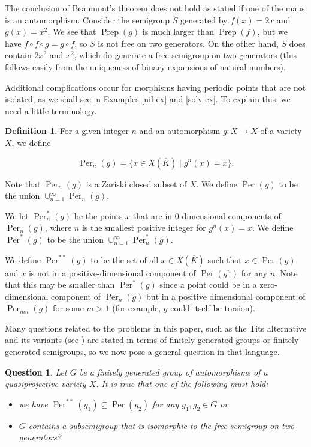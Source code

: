\documentclass{amsart}
\newcommand{\lra}{\longrightarrow}
\DeclareMathOperator{\Prep}{Prep}
\DeclareMathOperator{\Per}{Per}
\newcommand{\Kbar}{ \overline{K}}
\newtheorem{quest}[thm]{Question}
\theoremstyle{definition}
\newtheorem{defn}[thm]{Definition}
\begin{document}
The conclusion of Beaumont's theorem does not hold as stated if one
of the maps is an automorphism.  Consider the semigroup $S$
generated by $f(x) = 2x$ and $g(x) = x^2$.  We see that $\Prep(g)$ is
much larger than $\Prep(f)$, but we have
$f \circ f \circ g = g \circ f$, so $S$ is not free on two generators.
On the other hand, $S$ does contain $2x^2$ and $x^2$, which do generate a
free semigroup on two generators (this follows easily from the
uniqueness of binary expansions of natural numbers).

Additional complications occur for morphisms having periodic points
that are not isolated, as we shall see in Examples \ref{nil-ex} and
\ref{solv-ex}.  To explain this, we need a little terminology.

\begin{defn}
For a given integer $n$ and an automorphism $g: X \lra X$ of a variety
$X$, we define

\[  \Per_n(g) = \{ x \in X(\Kbar) \; | \; \text{$g^n(x) = x$}
    \}. \]

  Note that $\Per_n(g)$ is a Zariski closed subset of $X$.  We define
  $\Per(g)$ to be the union $\cup_{n=1}^\infty \Per_n(g)$.  

  We let $\Per_n^*(g)$ be the points $x$ that are in
  0-dimensional components of $\Per_n(g)$, where $n$ is the smallest
  positive integer for $g^n(x) = x$. We define $\Per^*(g)$ to be the
  union $\cup_{n=1}^\infty \Per^*_n(g)$. 

We define $\Per^{**}(g)$ to be the set of all $x \in X(\Kbar)$ such
that $x \in \Per(g)$ and $x$ is not in a positive-dimensional
component of $\Per(g^n)$ for any $n$.  Note that this may be smaller
than $\Per^*(g)$ since a point could be in a zero-dimensional
component of $\Per_n(g)$ but in a positive dimensional component of
$\Per_{mn}(g)$ for some $m > 1$ (for example, $g$ could itself be torsion).  

\end{defn}

Many questions related to the problems in this paper, such as the Tits
alternative \cite{Tits} and its variants (see \cite{Tits, BHPT,
  Tits-Var, Tits-Var-Z, Hu}) are stated in terms of finitely generated
groups or finitely generated semigroups, so we now pose a general
question in that language.

\begin{quest}\label{TitsQ1}
  Let $G$ be a finitely generated group of automorphisms of a
  quasiprojective variety $X$.  It is true that one of the following
  must hold:
\begin{itemize}
\item[(i)] we have $\Per^{**}(g_1) \subseteq \Per(g_2)$ for any $g_1,
  g_2 \in G$ or
\item[(ii)] $G$ contains a subsemigroup that is isomorphic to the free
  semigroup on two generators?
\end{itemize}
\end{quest}
\end{document}
